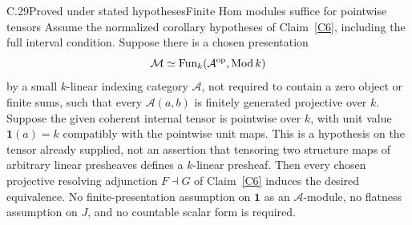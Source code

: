 \begin{claim}{C.29}{Proved under stated hypotheses}{Finite Hom modules suffice for pointwise tensors}\label{C29}
Assume the normalized corollary hypotheses of Claim~\ref{C6}, including the full interval condition. Suppose there is a chosen presentation
\[
 \mathcal M\simeq\operatorname{Fun}_k(\mathcal A^{\mathrm{op}},\operatorname{Mod} k)
\]
by a small $k$-linear indexing category $\mathcal A$, not required to contain a zero object or finite sums, such that every $\mathcal A(a,b)$ is finitely generated projective over $k$. Suppose the given coherent internal tensor is pointwise over $k$, with unit value $\mathbf1(a)=k$ compatibly with the pointwise unit maps. This is a hypothesis on the tensor already supplied, not an assertion that tensoring two structure maps of arbitrary linear presheaves defines a $k$-linear presheaf. Then every chosen projective resolving adjunction $F\dashv G$ of Claim~\ref{C6} induces the desired equivalence. No finite-presentation assumption on $\mathbf1$ as an $\mathcal A$-module, no flatness assumption on $J$, and no countable scalar form is required.
\end{claim}
